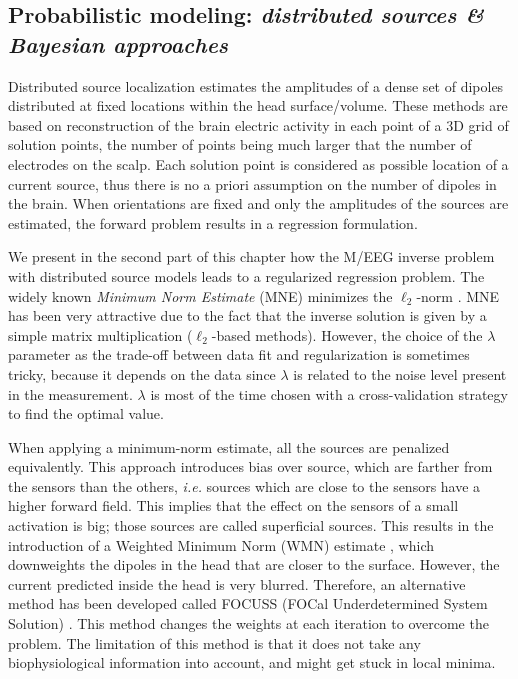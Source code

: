 \subsection{Probabilistic modeling: \textit{distributed sources \& Bayesian approaches}} \label{section_distributed}
Distributed source localization estimates the amplitudes of a dense set of dipoles distributed at fixed locations within the head surface/volume. These methods are based on reconstruction of the brain electric activity in each point of a 3D grid of solution points, the number of points being much larger that the number of electrodes on the scalp. Each solution point is considered as possible location of a current source, thus there is no a priori assumption on the number of dipoles in the brain.
When orientations are fixed and only the amplitudes of the sources are estimated, the forward problem results in a regression formulation.%

We present in the second part of this chapter how the M/EEG inverse problem with distributed source models leads to a regularized regression problem. The widely known \textit{Minimum Norm Estimate} (MNE) minimizes the $\ell_2$-norm \cite{hamalainen1994interpreting}. %
MNE has been very attractive due to the fact that the inverse solution is given by a simple matrix multiplication ($\ell_2$-based methods). However, the choice of the $\lambda$ parameter as the trade-off between data fit and regularization is sometimes tricky, because it depends on the data since $\lambda$ is related to the noise level present in the measurement. $\lambda$ is most of the time chosen with a cross-validation strategy to find the optimal value.

When applying a minimum-norm estimate, all the sources are penalized equivalently. This approach introduces bias over source, which are farther from the sensors than the others, \textit{i.e.} sources which are close to the sensors have a higher forward field. This implies that the effect on the sensors of a small activation is big; those sources are called superficial sources. This results in the introduction of a Weighted Minimum Norm (WMN) estimate \cite{lin2006assessing}, which downweights the dipoles in the head that are closer to the surface. However, the current predicted inside the head is very blurred. Therefore, an alternative method has been developed called FOCUSS (FOCal Underdetermined System Solution) \cite{gorodnitsky1995neuromagnetic}. This method changes the weights at each iteration to overcome the problem. The limitation of this method is that it does not take any biophysiological information into account, and might get stuck in local minima.

